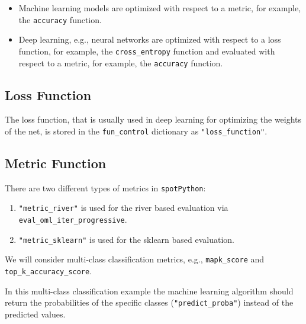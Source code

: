 \documentclass[
  letterpaper,
  DIV=11,
  numbers=noendperiod]{scrreprt}
\providecommand{\tightlist}{%
  \setlength{\itemsep}{0pt}\setlength{\parskip}{0pt}}\usepackage{longtable,booktabs,array}
\begin{document}
\begin{itemize}
\tightlist
\item
  Machine learning models are optimized with respect to a metric, for
  example, the \texttt{accuracy} function.
\item
  Deep learning, e.g., neural networks are optimized with respect to a
  loss function, for example, the \texttt{cross\_entropy} function and
  evaluated with respect to a metric, for example, the \texttt{accuracy}
  function.
\end{itemize}

\hypertarget{loss-function}{%
\subsection{Loss Function}\label{loss-function}}

The loss function, that is usually used in deep learning for optimizing
the weights of the net, is stored in the \texttt{fun\_control}
dictionary as \texttt{"loss\_function"}.

\hypertarget{metric-function-1}{%
\subsection{Metric Function}\label{metric-function-1}}

There are two different types of metrics in \texttt{spotPython}:

\begin{enumerate}
\def\labelenumi{\arabic{enumi}.}
\tightlist
\item
  \texttt{"metric\_river"} is used for the river based evaluation via
  \texttt{eval\_oml\_iter\_progressive}.
\item
  \texttt{"metric\_sklearn"} is used for the sklearn based evaluation.
\end{enumerate}

We will consider multi-class classification metrics, e.g.,
\texttt{mapk\_score} and \texttt{top\_k\_accuracy\_score}.

\begin{tcolorbox}[enhanced jigsaw, titlerule=0mm, colbacktitle=quarto-callout-note-color!10!white, coltitle=black, arc=.35mm, toptitle=1mm, colback=white, left=2mm, opacityback=0, bottomtitle=1mm, bottomrule=.15mm, breakable, opacitybacktitle=0.6, colframe=quarto-callout-note-color-frame, rightrule=.15mm, toprule=.15mm, leftrule=.75mm, title=\textcolor{quarto-callout-note-color}{\faInfo}\hspace{0.5em}{Predict Probabilities}]

In this multi-class classification example the machine learning
algorithm should return the probabilities of the specific classes
(\texttt{"predict\_proba"}) instead of the predicted values.

\end{tcolorbox}
\end{document}
